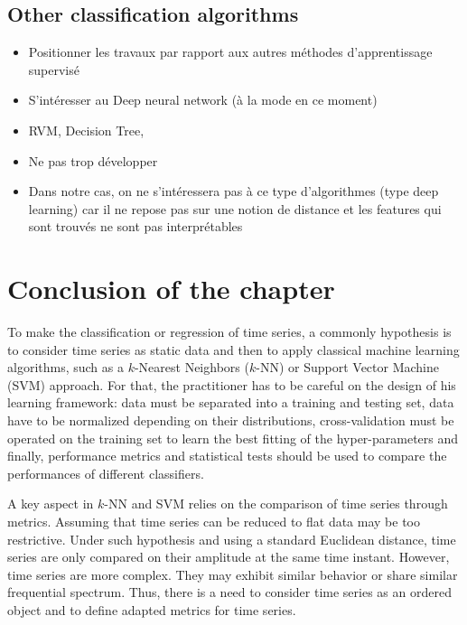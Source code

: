 \subsection{Other classification algorithms}
\begin{itemize}
	\item Positionner les travaux par rapport aux autres méthodes d'apprentissage supervisé
	\item S'intéresser au Deep neural network (à la mode en ce moment)
	\item RVM, Decision Tree, 
	\item Ne pas trop développer
	\item Dans notre cas, on ne s'intéressera pas à ce type d'algorithmes (type deep learning) car il ne repose pas sur une notion de distance et les features qui sont trouvés ne sont pas interprétables
\end{itemize}



\section{Conclusion of the chapter}

To make the classification or regression of time series, a commonly hypothesis is to consider time series as static data and then to apply classical machine learning algorithms, such as a $k$-Nearest Neighbors ($k$-NN) or Support Vector Machine (SVM) approach. For that, the practitioner has to be careful on the design of his learning framework: data must be separated into a training and testing set, data have to be normalized depending on their distributions, cross-validation must be operated on the training set to learn the best fitting of the hyper-parameters and finally, performance metrics and statistical tests should be used to compare the performances of different classifiers.

A key aspect in $k$-NN and SVM relies on the comparison of time series through metrics. Assuming that time series can be reduced to flat data may be too restrictive. Under such hypothesis and using a standard Euclidean distance, time series are only compared on their amplitude at the same time instant. However, time series are more complex. They may exhibit similar behavior or share similar frequential spectrum. Thus, there is a need to consider time series as an ordered object and to define adapted metrics for time series.


